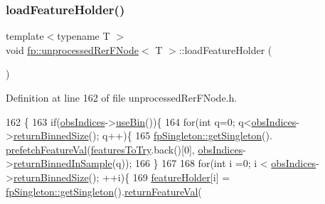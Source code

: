 \subsubsection{\texorpdfstring{load\+Feature\+Holder()}{loadFeatureHolder()}}
{\footnotesize\ttfamily template$<$typename T $>$ \\
void \hyperlink{classfp_1_1unprocessedRerFNode}{fp\+::unprocessed\+Rer\+F\+Node}$<$ T $>$\+::load\+Feature\+Holder (\begin{DoxyParamCaption}{ }\end{DoxyParamCaption})\hspace{0.3cm}{\ttfamily [inline]}}



Definition at line 162 of file unprocessed\+Rer\+F\+Node.\+h.


\begin{DoxyCode}
162                                                \{
163                     \textcolor{keywordflow}{if}(\hyperlink{classfp_1_1unprocessedRerFNode_ad52d9d508bf378bc793b8cf961163735}{obsIndices}->\hyperlink{classfp_1_1stratifiedInNodeClassIndices_af740a8054cefe977f8f1288fc6b39109}{useBin}())\{
164                         \textcolor{keywordflow}{for}(\textcolor{keywordtype}{int} q=0; q<\hyperlink{classfp_1_1unprocessedRerFNode_ad52d9d508bf378bc793b8cf961163735}{obsIndices}->\hyperlink{classfp_1_1stratifiedInNodeClassIndices_a9f77fe5e638170c4ad4ce99541561cfc}{returnBinnedSize}(); q++)\{
165                             \hyperlink{classfp_1_1fpSingleton_a8bdae77b68521003e3fc630edec2e240}{fpSingleton::getSingleton}().
      \hyperlink{classfp_1_1fpSingleton_ab789c4e4bfb3248711a5857015008f8d}{prefetchFeatureVal}(\hyperlink{classfp_1_1unprocessedRerFNode_aa2028578f341c8f41cf000eb40d228f2}{featuresToTry}.back()[0],
      \hyperlink{classfp_1_1unprocessedRerFNode_ad52d9d508bf378bc793b8cf961163735}{obsIndices}->\hyperlink{classfp_1_1stratifiedInNodeClassIndices_a775d9a820b6f48ab44cd1ac4ffde1578}{returnBinnedInSample}(q));
166                         \}
167 
168                         \textcolor{keywordflow}{for}(\textcolor{keywordtype}{int} i =0; i < \hyperlink{classfp_1_1unprocessedRerFNode_ad52d9d508bf378bc793b8cf961163735}{obsIndices}->\hyperlink{classfp_1_1stratifiedInNodeClassIndices_a9f77fe5e638170c4ad4ce99541561cfc}{returnBinnedSize}(); ++i)\{
169                             \hyperlink{classfp_1_1unprocessedRerFNode_a09fa17210a5916239cba6716c636cc4e}{featureHolder}[i] = 
      \hyperlink{classfp_1_1fpSingleton_a8bdae77b68521003e3fc630edec2e240}{fpSingleton::getSingleton}().\hyperlink{classfp_1_1fpSingleton_aacc2eb894a219e2fe234743b51fa1a76}{returnFeatureVal}(

\end{DoxyCode}
